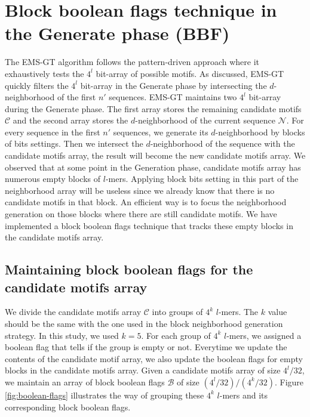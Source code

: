 \section{Block boolean flags technique in the Generate phase (BBF)}

The EMS-GT algorithm follows the pattern-driven approach where it exhaustively tests the $4^l$ bit-array of possible motifs. As discussed, EMS-GT quickly filters the $4^l$ bit-array in the Generate phase by intersecting the $d$-neighborhood of the first $n'$ sequences. EMS-GT maintains two $4^l$ bit-array during the Generate phase. The first array stores the remaining candidate motifs $\mathcal{C}$ and the second array stores the $d$-neighborhood of the current sequence $\mathcal{N}$. For every sequence in the first $n'$ sequences, we generate its $d$-neighborhood by blocks of bits settings. Then we intersect the $d$-neighborhood of the sequence with the candidate motifs array, the result will become the new candidate motifs array. We observed that at some point in the Generation phase, candidate motifs array has numerous empty blocks of $l$-mers. Applying block bits setting in this part of the neighborhood array will be useless since we already know that there is no candidate motifs in that block. An efficient way is to focus the neighborhood generation on those blocks where there are still candidate motifs. We have implemented a block boolean flags technique that tracks these empty blocks in the candidate motifs array.

\subsection{Maintaining block boolean flags for the candidate motifs array}
We divide the candidate motifs array $\mathcal{C}$ into groups of $4^k$ $l$-mers. The $k$ value should be the same with the one used in the block neighborhood generation strategy. In this study, we used $k = 5$. For each group of $4^k$ $l$-mers, we assigned a boolean flag that tells if the group is empty or not. Everytime we update the contents of the candidate motif array, we also update the boolean flags for empty blocks in the candidate motifs array. Given a candidate motifs array of size $4^l/32$, we maintain an array of block boolean flags $\mathcal{B}$ of size $(4^l/32)/(4^k/32)$. Figure \ref{fig:boolean-flags} illustrates the way of grouping these $4^k$ $l$-mers and its corresponding block boolean flags.

